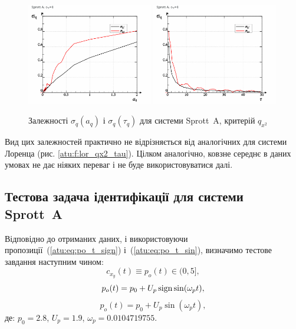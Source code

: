 \begin{figure}[htb!]
\begin{center}
  \includegraphics[width=0.49\textwidth]{p/cha/spr_a/sprott_a_qx2_tau-p_aq_sd.png}
  \hfill
  \includegraphics[width=0.49\textwidth]{p/cha/spr_a/sprott_a_qx2_tau-p_tau_sd.png}
\end{center}
\caption{Залежності $ \sigma_{q} (a_q) $ і $ \sigma_{q} (\tau_q) $ для системи Sprott~A, критерій $ q_{x^2} $}
\label{atu:f:spr_a_qx2_tau}
\end{figure}

Вид цих залежностей практично не відрізняється від аналогічних
для системи Лоренца (рис. \ref{atu:f:lor_qx2_tau}). Цілком аналогічно,
ковзне середнє в даних умовах не дає ніяких переваг і не буде
використовуватися далі.



\subsection{Тестова задача ідентифікації для системи Sprott~A} %

Відповідно до отриманих даних, і використовуючи
пропозиції~(\ref{atu:eq:po_t_sign}) і~(\ref{atu:eq:po_t_sin}),
%
визначимо тестове завдання наступним чином:
\[
  c_{x_y}(t) \equiv p_o(t) \in (0, 5],
\]
%
\begin{equation}
  p_o(t) = p_0 +  U_{p} \operatorname*{sign} \sin( \omega_{p} t ),
  \label{atu:eq:spr_a_po_t_sign}
\end{equation}
%
%
\begin{equation}
  p_o(t) = p_0 +  U_{p} \sin( \omega_{p} t ),
  \label{atu:eq:spr_a_po_t_sin}
\end{equation}
%
де:
$p_0 = 2.8$, $U_p=1.9$, $\omega_p=0.0104719755$.

